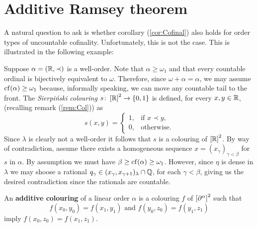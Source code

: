 \section{Additive Ramsey theorem}


A natural question to ask is whether corollary (\ref{cor:Cofinal}) also holds for order types of uncountable cofinality.  Unfortunately,  this is not the case.  This is illustrated in the following example:
\begin{exm}
	Suppose $\alpha=(\mathbb{R},\prec)$ is a well-order.  Note that $\alpha\geq\omega_1$ and that every countable ordinal is bijectively equivalent to $\omega$.  Therefore, since $\omega+\alpha=\alpha$, we may assume $\operatorname{cf}(\alpha)\geq\omega_1$ because, informally speaking, we can move any countable tail to the front. The \textit{Sierpi\'nski colouring} $s\colon\left[\mathbb{R}\right]^{2}\to\left\lbrace 0,1\right\rbrace$ is defined, for every $x,y\in\mathbb{R}$, (recalling remark (\ref{rem:Col})) as
	\begin{equation}
		s(x,y)=
		\begin{cases}
			1,  &\text{if }x\prec y,\\
			0,   &\text{otherwise.}
		\end{cases}
	\end{equation}
	Since $\lambda$ is clearly not a well-order it follows that $s$ is a colouring of $\left[\mathbb{R}\right]^{2}$.  By way of contradiction, assume there exists a homogeneous sequence $x=(x_{\gamma})_{\gamma<\beta}$ for $s$ in $\alpha$.  By assumption we must have $\beta\geq\operatorname{cf}(\alpha)\geq\omega_1$.  However, since $\eta$ is dense in $\lambda$ we may shoose a rational $q_\gamma\in(x_\gamma,x_{\gamma+1})_{\lambda}\cap\mathbb{Q}$, for each $\gamma<\beta$, giving us the desired contradiction since the rationals are countable.
\end{exm}

\begin{dfn}
	An \textbf{additive colouring} of a linear order $\alpha$ is a colouring $f$ of $\left[\partial^{\alpha}\right]^{2}$ such that
	\begin{equation}
		f(x_0,y_0)=f(x_1,y_1)\text{ and }f(y_0,z_0)=f(y_1,z_1)
	\end{equation}
	imply $f(x_0,z_0)=f(x_1,z_1)$.
\end{dfn}

